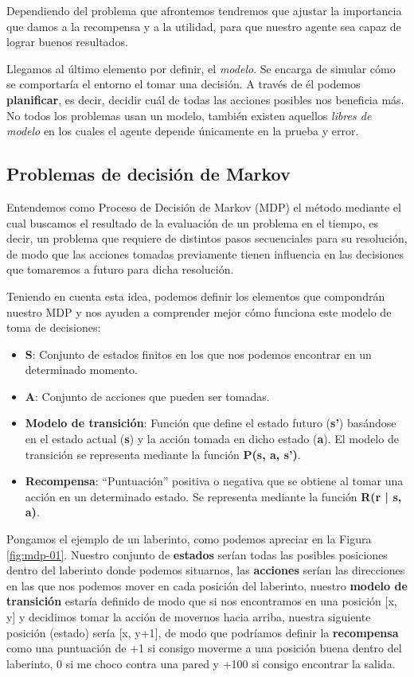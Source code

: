 Dependiendo del problema que afrontemos tendremos que ajustar la importancia que damos a la recompensa y a la utilidad, para que nuestro agente sea capaz de lograr buenos resultados.

Llegamos al último elemento por definir, el \textit{modelo}. Se encarga de simular cómo se comportaría el entorno el tomar una decisión. A través de él podemos \textbf{planificar}, es decir, decidir cuál de todas las acciones posibles nos beneficia más. No todos los problemas usan un modelo, también existen aquellos \textit{libres de modelo} en los cuales el agente depende únicamente en la prueba y error. 

\subsection{Problemas de decisión de Markov}

Entendemos como Proceso de Decisión de Markov (MDP) el método mediante el cual buscamos el resultado de la evaluación de un problema en el tiempo, es decir, un problema que requiere de distintos pasos secuenciales para su resolución, de modo que las acciones tomadas previamente tienen influencia en las decisiones que tomaremos a futuro para dicha resolución.

Teniendo en cuenta esta idea, podemos definir los elementos que compondrán nuestro MDP y nos ayuden a comprender mejor cómo funciona este modelo de toma de decisiones:

\begin{itemize}
    \item \textbf{S}: Conjunto de estados finitos en los que nos podemos encontrar en un determinado momento.
    \item \textbf{A}: Conjunto de acciones que pueden ser tomadas.
    \item \textbf{Modelo de transición}: Función que define el estado futuro (\textbf{s'}) basándose en el estado actual (\textbf{s}) y la acción tomada en dicho estado (\textbf{a}). El modelo de transición se representa mediante la función \textbf{P(s, a, s’)}.
    \item \textbf{Recompensa}: “Puntuación” positiva o negativa que se obtiene al tomar una acción en un determinado estado. Se representa mediante la función \textbf{R(r | s, a)}.
\end{itemize}

Pongamos el ejemplo de un laberinto, como podemos apreciar en la Figura \ref{fig:mdp-01}. Nuestro conjunto de \textbf{estados} serían todas las posibles posiciones dentro del laberinto donde podemos situarnos, las \textbf{acciones} serían las direcciones en las que nos podemos mover en cada posición del laberinto, nuestro \textbf{modelo de transición} estaría definido de modo que si nos encontramos en una posición [x, y] y decidimos tomar la acción de movernos hacia arriba, nuestra siguiente posición (estado) sería [x, y+1], de modo que podríamos definir la  \textbf{recompensa} como una puntuación de +1 si consigo moverme a una posición buena dentro del laberinto, 0 si me choco contra una pared y +100 si consigo encontrar la salida.

